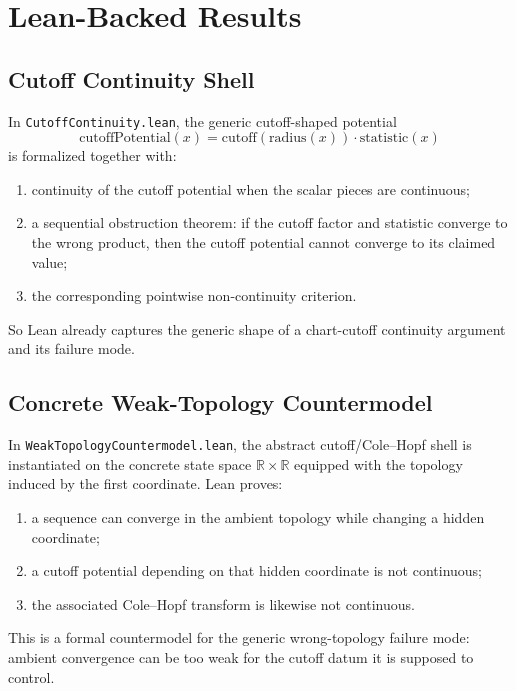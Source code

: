 \documentclass[11pt]{article}
\begin{document}
\section{Lean-Backed Results}

\subsection{Cutoff Continuity Shell}

In \texttt{CutoffContinuity.lean}, the generic cutoff-shaped potential
\[
\mathrm{cutoffPotential}(x) = \mathrm{cutoff}(\mathrm{radius}(x))
\cdot \mathrm{statistic}(x)
\]
is formalized together with:
\begin{enumerate}[leftmargin=1.5em]
  \item continuity of the cutoff potential when the scalar pieces are
  continuous;
  \item a sequential obstruction theorem: if the cutoff factor and statistic
  converge to the wrong product, then the cutoff potential cannot converge to
  its claimed value;
  \item the corresponding pointwise non-continuity criterion.
\end{enumerate}

So Lean already captures the generic shape of a chart-cutoff continuity
argument and its failure mode.

\subsection{Concrete Weak-Topology Countermodel}

In \texttt{WeakTopologyCountermodel.lean}, the abstract cutoff/Cole--Hopf shell
is instantiated on the concrete state space \(\mathbb{R}\times\mathbb{R}\)
equipped with the topology induced by the first coordinate.  Lean proves:
\begin{enumerate}[leftmargin=1.5em]
  \item a sequence can converge in the ambient topology while changing a hidden
  coordinate;
  \item a cutoff potential depending on that hidden coordinate is not
  continuous;
  \item the associated Cole--Hopf transform is likewise not continuous.
\end{enumerate}

This is a formal countermodel for the generic wrong-topology failure mode:
ambient convergence can be too weak for the cutoff datum it is supposed to
control.
\end{document}
